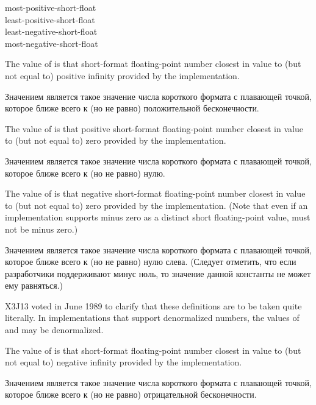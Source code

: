 \begin{defun}[Constant]
most-positive-short-float \\
least-positive-short-float \\
least-negative-short-float \\
most-negative-short-float

The value of  is that short-format
floating-point number closest in value to (but not equal to)
positive infinity provided by the implementation.

Значением  является такое значение числа
короткого формата с плавающей точкой, которое ближе всего к (но не равно)
положительной бесконечности. 

The value of  is that positive short-format
floating-point number closest in value to (but not equal to) zero provided by
the implementation.

Значением  является такое значение числа
короткого формата с плавающей точкой, которое ближе всего к (но не равно) нулю. 

The value of  is that negative short-format
floating-point number closest in value to (but not equal to) zero provided by
the implementation.  (Note that even if an implementation supports
minus zero as a distinct short floating-point value,
 must not be minus zero.)

Значением  является такое значение числа
короткого формата с плавающей точкой, которое ближе всего к (но не равно) нулю
слева. (Следует отметить, что если разработчики поддерживают минус ноль, то
значение данной константы не может ему равняться.) 

\begin{newer}
X3J13 voted in June 1989 
to clarify that these definitions are to be taken quite literally.
In implementations that support denormalized numbers,
the values of  and
 may be denormalized.
\end{newer}

The value of  is that short-format
floating-point number closest in value to (but not equal to)
negative infinity provided by the implementation.

Значением  является такое значение числа
короткого формата с плавающей точкой, которое ближе всего к (но не равно)
отрицательной бесконечности. 
\end{defun}

